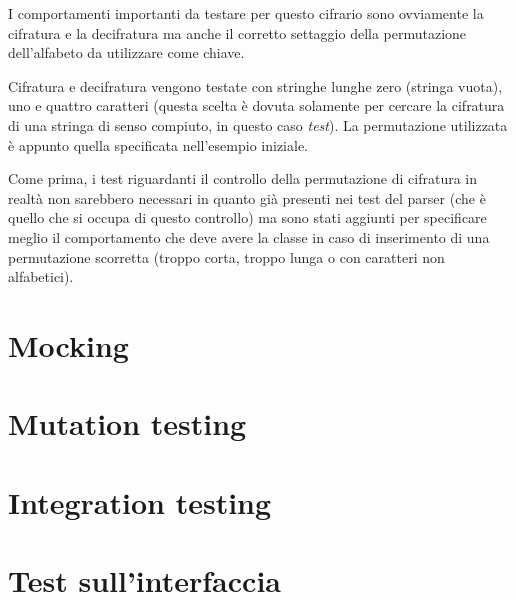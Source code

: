 			I comportamenti importanti da testare per questo cifrario sono ovviamente la cifratura e la decifratura ma anche il corretto settaggio della permutazione dell'alfabeto da utilizzare come chiave.
			
			Cifratura e decifratura vengono testate con stringhe lunghe zero (stringa vuota), uno e quattro caratteri (questa scelta è dovuta solamente per cercare la cifratura di una stringa di senso compiuto, in questo caso \emph{test}). La permutazione utilizzata è appunto quella specificata nell'esempio iniziale.
			
			Come prima, i test riguardanti il controllo della permutazione di cifratura in realtà non sarebbero necessari in quanto già presenti nei test del parser (che è quello che si occupa di questo controllo) ma sono stati aggiunti per specificare meglio il comportamento che deve avere la classe in caso di inserimento di una permutazione scorretta (troppo corta, troppo lunga o con caratteri non alfabetici).
			
	\section{Mocking}
	\section{Mutation testing}
	\section{Integration testing}
	\section{Test sull'interfaccia}